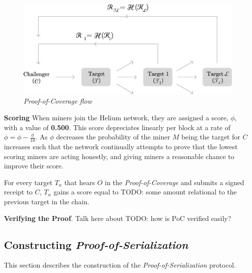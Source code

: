 \documentclass[letterpaper,11pt]{article}
\def\proofofcoverage/{\emph{Proof-of-Coverage}}
\newcommand{\todo}[1]{}
\renewcommand{\todo}[1]{{\color{red} TODO: {#1}}}
\begin{document}
\begin{figure}[H]
	\begin{center}
  		\includegraphics[width=\textwidth]{diagram4.eps}
  		\caption{\emph{\proofofcoverage/ flow}}
  		\label{fig:poc-flow}
 	\end{center}
\end{figure}

\textbf{Scoring}\label{scores} When miners join the Helium network, they are assigned a score, $\mathit{\phi}$, with a value of \textbf{0.500}. This score depreciates linearly per block at a rate of $\mathit{\phi = \phi - \frac{\phi}{10}}$. As $\mathit{\phi}$ decreases the probability of the miner $\mathit{M}$ being the target for $\mathit{C}$ increases such that the network continually attempts to prove that the lowest scoring miners are acting honestly, and giving miners a reasonable chance to improve their score.\newline

For every target $\mathit{T_n}$ that hears $\mathit{O}$ in the \proofofcoverage/ and submits a signed receipt to $\mathit{C}$, $\mathit{T_n}$ gains a score equal to \todo{some amount relational to the previous target in the chain}.\newline

\textbf{Verifying the Proof}. Talk here about \todo{how is PoC verified easily?}

\subsection{Constructing \emph{Proof-of-Serialization}}

This section describes the construction of the \emph{Proof-of-Serialization} protocol.\newline
\end{document}
